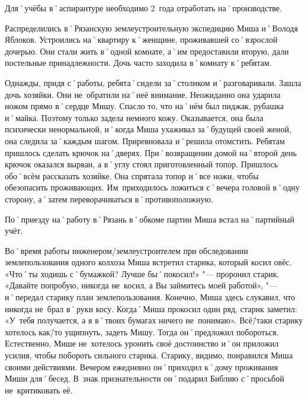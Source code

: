 Для˚учёбы в˚аспирантуре необходимо 2~года отработать на˚производстве.

Распределились в˚Рязанскую землеустроительную экспедицию Миша и˚Володя Яблоков. Устроились на˚квартиру к˚женщине, проживавшей со˚взрослой дочерью. Они стали жить в˚одной комнате, а˚им предоставили вторую, дали постельные принадлежности. Дочь часто заходила в˚комнату к˚ребятам.

Однажды, придя с˚работы, ребята˚сидели за˚столиком и˚разговаривали. Зашла дочь хозяйки. Они не~обратили на˚неё внимание. Неожиданно она ударила ножом прямо в˚сердце Мишу. Спасло то, что на˚нём был пиджак, рубашка и˚майка. Поэтому только задела немного кожу. Оказывается, она была психически ненормальной, и˚когда Миша ухаживал за˚будущей своей женой, она следила за˚каждым шагом. Приревновала и˚решила отомстить. Ребятам пришлось сделать крючок на˚дверях. При˚возвращении домой на˚второй день крючок оказался  вырван, а в˚углу стоял приготовленный топор. Пришлось обо˚всём рассказать хозяйке. Она спрятала топор и˚все ножи, чтобы обезопасить проживающих. Им~приходилось ложиться с˚вечера головой в˚одну сторону, а˚затем переворачиваться в˚противоположную.

По˚приезду на˚работу в˚Рязань в˚обкоме партии Миша встал на˚партийный учёт.

Во˚время работы инженером\-/землеустроителем при обследовании землепользования одного колхоза Миша встретил старика, который косил овёс. «Что˚ты ходишь с˚бумажкой? Лучше бы˚покосил!» "--- проронил старик. «Давайте попробую, никогда не~косил, а Вы займитесь моей работой», "--- и˚передал старику план землепользования. Конечно, Миша здесь слукавил, что никогда не~брал в˚руки косу. Когда˚Миша прокосил один ряд, старик заметил: «У~тебя получается, а я в˚твоих бумагах ничего не~понимаю». Всё\=/таки старику хотелось как\=/то ущипнуть, задеть Мишу. Тогда он˚предложил побороться. Естественно, Мише не~хотелось уронить своё достоинство и˚он приложил усилия, чтобы побороть сильного старика. Старику, видимо, понравился Миша своими действиями. Вечером ежедневно он˚приходил к˚дому проживания Миши для˚бесед. В~знак признательности он˚подарил Библию с˚просьбой не~критиковать её.

